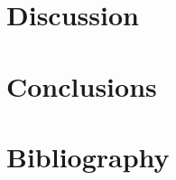 \documentclass[a4paper,fleqn]{cas-dc}
\begin{document}
\section{Discussion}

\section{Conclusions}

\section{Bibliography}


\appendix


\printcredits

% 

% 


\end{document}
